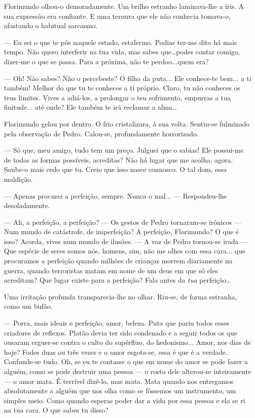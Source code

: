 Florimundo olhou-o demoradamente. Um brilho estranho laminava-lhe a
íris. A sua expressão era confiante. E uma ternura que ele não conhecia
tomava-o, afastando o habitual sarcasmo.

--- Eu sei o que te pôs naquele estado, estafermo. Podias ter-me dito há
mais tempo. Não quero interferir na tua vida, mas sabes que\ldots{}podes
contar comigo, dizer-me o que se passa. Para a próxima, não te
perdoo...quem era?

--- Oh! Não sabes? Não o percebeste? O filho da puta... Ele conhece-te
bem... a ti também! Melhor do que tu te conheces a ti próprio. Claro, tu
não conheces os teus limites. Vives a adiá-los, a prolongar o teu
sofrimento, empurras a tua finitude... até onde? Ele também te irá
reclamar a alma\ldots{}

Florimundo gelou por dentro. O frio cristalizara, à sua volta. Sentiu-se
fulminado pela observação de Pedro. Calou-se, profundamente horrorizado.

--- Só que, meu amigo, tudo tem um preço. Julguei que o sabias! Ele
possui-me de todas as formas possíveis, acreditas? Não há lugar que me
acolha, agora. Soube-o mais cedo que tu. Creio que isso nasce connosco.
O tal dom, essa maldição.

--- Apenas procurei a perfeição, sempre. Nunca o mal... --- Respondeu-lhe
desoladamente.

--- Ah, a perfeição, a perfeição? --- Os gestos de Pedro tornaram-se
irónicos --- Num mundo de catástrofe, de imperfeição? A perfeição,
Florimundo? O que é isso? Acorda, vives num mundo de ilusões. --- A voz de
Pedro tornou-se irada --- Que espécie de seres somos nós, homens, sim, não
me olhes com essa cara... que procuramos a perfeição quando milhões de
crianças morrem diariamente na guerra, quando terroristas matam em nome
de um deus em que só eles acreditam? Que lugar existe para a perfeição?
Fala antes da \emph{tua} perfeição\ldots{}

Uma irritação profunda transparecia-lhe no olhar. Riu-se, de forma
estranha, como um bufão.

--- Porra, mais ideais e perfeição, amor, beleza. Puta que pariu todos
esses criadores de reflexos. Platão devia ter sido condenado e a seguir
todos os que ousaram erguer-se contra o culto do supérfluo, do
hedonismo... Amor, nos dias de hoje? Fodes duas ou três vezes e o amor
esgota-se, essa é que é a verdade. Confunde-se tudo. Oh, se eu te
contasse o que em nome do amor se pode fazer a alguém, como se pode
destruir uma pessoa --- o rosto dele alterou-se inteiramente --- o amor
mata. É terrível dizê-lo, mas mata. Mata quando nos entregamos
absolutamente a alguém que nos olha como se fôssemos um instrumento, um
simples meio. Como quando esperas poder dar a vida por essa pessoa e ela
se ri na tua cara. O que sabes tu disso?

